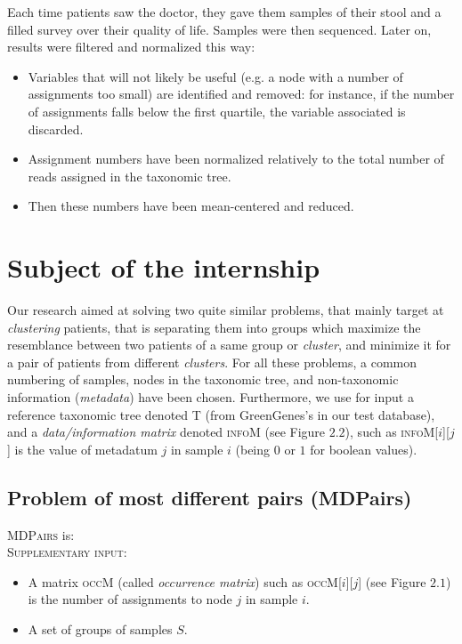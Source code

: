 \documentclass{report}
\begin{document}
Each time patients saw the doctor, they gave them samples of their stool and a filled survey over their quality of life. Samples were then sequenced. Later on, results were filtered and normalized this way:

\begin{itemize}
\item Variables that will not likely be useful (e.g. a node with a number of assignments too small) are identified and removed: for instance, if the number of assignments falls below the first quartile, the variable associated is discarded.
\item Assignment numbers have been normalized relatively to the total number of reads assigned in the taxonomic tree.
\item Then these numbers have been mean-centered and reduced.
\end{itemize}

\newpage

\chapter{Subject of the internship}

Our research aimed at solving two quite similar problems, that mainly target at \emph{clustering} patients, that is separating them into groups which maximize the resemblance between two patients of a same group or \emph{cluster}, and minimize it for a pair of patients from different \emph{clusters}. For all these problems, a common numbering of samples, nodes in the taxonomic tree, and non-taxonomic information (\emph{metadata}) have been chosen. Furthermore, we use for input a reference taxonomic tree denoted \textsc{T} (from GreenGenes's in our test database), and a \emph{data/information matrix} denoted \textsc{infoM} (see Figure $2.2$), such as \textsc{infoM}[$i$][$j$] is the value of metadatum $j$ in sample $i$ (being $0$ or $1$ for boolean values). 

\section{Problem of most different pairs (MDPairs)}
\textsc{MDPairs} is:\\

\textsc{Supplementary input:} 
                \begin{itemize}
                \item A matrix \textsc{occM} (called \emph{occurrence matrix}) such as \textsc{occM}[$i$][$j$] (see Figure $2.1$) is the number of assignments to node $j$ in sample $i$.
                \item A set of groups of samples $S$.
                \end{itemize}
\end{document}
